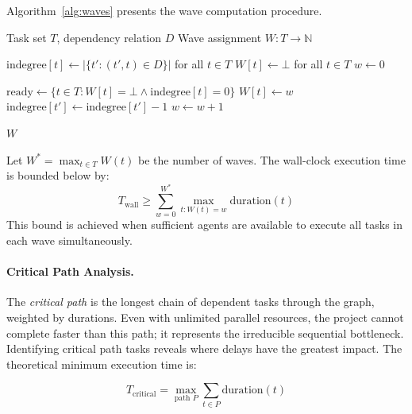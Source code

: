 Algorithm~\ref{alg:waves} presents the wave computation procedure.

\begin{algorithm}[htbp]
\caption{Wave Computation via Topological Sort}
\label{alg:waves}
\begin{algorithmic}[1]
\Require Task set $T$, dependency relation $D$
\Ensure Wave assignment $W: T \rightarrow \mathbb{N}$

\State $\text{indegree}[t] \gets |\{t' : (t', t) \in D\}|$ for all $t \in T$
\State $W[t] \gets \bot$ for all $t \in T$
\State $w \gets 0$

    \State $\text{ready} \gets \{t \in T : W[t] = \bot \land \text{indegree}[t] = 0\}$
        \State $W[t] \gets w$
    \EndFor
            \State $\text{indegree}[t'] \gets \text{indegree}[t'] - 1$
        \EndFor
    \EndFor
    \State $w \gets w + 1$
\EndWhile

\State \Return $W$
\end{algorithmic}
\end{algorithm}

\begin{theorem}
\label{thm:parallelism}
Let $W^* = \max_{t \in T} W(t)$ be the number of waves. The wall-clock execution
time is bounded below by:
\begin{equation}
T_{\text{wall}} \geq \sum_{w=0}^{W^*} \max_{t: W(t)=w} \text{duration}(t)
\end{equation}
This bound is achieved when sufficient agents are available to execute all
tasks in each wave simultaneously.
\end{theorem}

\paragraph{Critical Path Analysis.}
The \textit{critical path} is the longest chain of dependent tasks through the
graph, weighted by durations. Even with unlimited parallel resources, the project
cannot complete faster than this path; it represents the irreducible sequential
bottleneck. Identifying critical path tasks reveals where delays have the greatest
impact. The theoretical minimum execution time is:

\begin{equation}
T_{\text{critical}} = \max_{\text{path } P} \sum_{t \in P} \text{duration}(t)
\end{equation}

